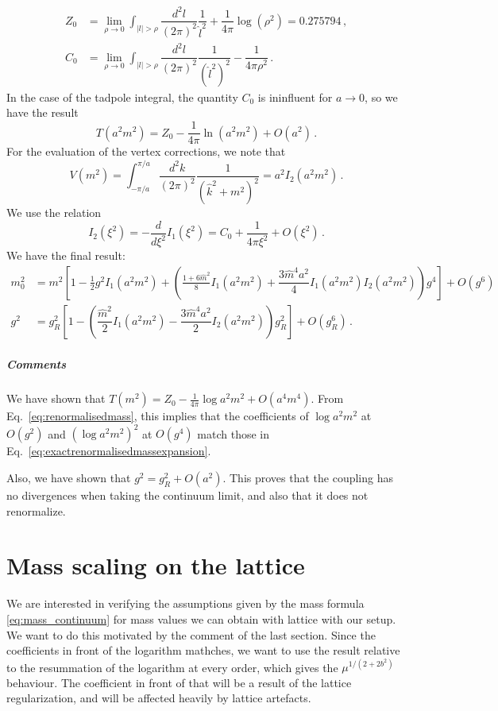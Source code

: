\documentclass[12pt,a4paper]{report}
\newcommand{\eq}{Eq.}
\begin{document}
\begin{align}
Z_0 &= \lim_{\rho \to 0} \int_{|l|> \rho}  \dfrac{d^2l}{(2 \pi)^2} \dfrac{1}{\hat l^2 } + \dfrac{1}{4 \pi} \log(\rho^2)=0.275794 \,, \\
C_0 &= \lim_{\rho \to 0}  \int_{|l|> \rho}  \dfrac{d^2l}{(2 \pi)^2} \dfrac{1}{(\hat l^2)^2 } - \dfrac{1}{4 \pi \rho^2} \,.
\end{align} In the case of the tadpole integral, the quantity $C_0$ is ininfluent for $a\to 0$, so we have the result \begin{equation}
T(a^2 m^2)= Z_0 - \dfrac{1}{4 \pi} \ln(a^2m^2) +O(a^2) \,.
\end{equation} For the evaluation of the vertex corrections, we note that \begin{equation}
V(m^2) = \int_{-\pi/a}^{\pi/a} \dfrac{d^2k}{(2 \pi)^2}\dfrac{1}{(\hat k^2 + m^2)^2} = a^2 I_2(a^2 m^2) \,.
\end{equation} We use the relation \begin{equation}
I_2(\xi^2) = - \dfrac{d}{d\xi^2} I_1(\xi^2) = C_0 + \dfrac{1}{4 \pi \xi^2} + O(\xi^2) \,.
\end{equation} We have the final result: \begin{align}
  m_0^2 &=  m^2\left[1 - \frac{1}{2}g^2 I_1( a^2 m^2) + \left(\frac{1 + 6 \hat m^2}{8} I_1(a^2m^2) + \dfrac{3\hat m^4a^2}{4}I_1(a^2m^2)I_2(a^2m^2)  \right) g^4 \right] + O( g^6 ) \\
g^2 &= g_R^2\left[1- \left( \dfrac{\hat  m^2}{2}I_1(a^2 m^2) - \dfrac{3 \hat m^4a^2}{2} I_2(a^2m^2) \right)g_R^2 \right] + O(g_R^6) \,.
\end{align}
 
\paragraph{Comments}
We have shown that $T(m^2)=Z_0-\frac{1}{4\pi}\log a^2m^2 + O(a^4m^4)$.
From \eq~\eqref{eq:renormalisedmass}, this implies that the coefficients of $\log a^2m^2$ at $O(g^2)$ and $(\log a^2m^2)^2$ at $O(g^4)$ match those in \eq~\eqref{eq:exactrenormalisedmassexpansion}.

Also, we have shown that $g^2 = g^2_R +O(a^2)$. This proves that the coupling has no divergences when taking the continuum limit, and also that it does not renormalize.

 
\chapter{Mass scaling on the lattice} 
\label{sec:mass_scaling}
We are interested in verifying the assumptions given by the mass formula \eqref{eq:mass_continuum} for  mass values we can obtain with lattice with our setup. We want to do this motivated by the comment of the last section. Since the coefficients in front of the logarithm mathches, we want to use the result relative to the resummation of the logarithm at every order, which gives the $\mu^{1/(2+2b^2)}$ behaviour. The coefficient in front of that will be a result of the lattice regularization, and will be affected heavily by lattice artefacts.
\end{document}
